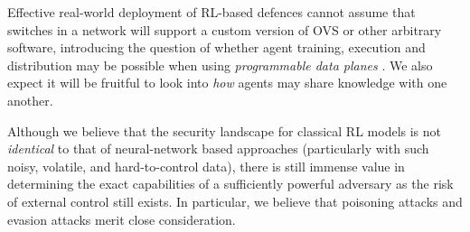 \documentclass[10pt, times, conference, letterpaper]{IEEEtran}
\begin{document}
Effective real-world deployment of RL-based defences cannot assume that switches in a network will support a custom version of OVS or other arbitrary software, introducing the question of whether agent training, execution and distribution may be possible when using \emph{programmable data planes} \cite{DBLP:conf/ancs/JouetP17}.
We also expect it will be fruitful to look into \emph{how} agents may share knowledge with one another.

Although we believe that the security landscape for classical RL models is not \emph{identical} to that of neural-network based approaches (particularly with such noisy, volatile, and hard-to-control data), there is still immense value in determining the exact capabilities of a sufficiently powerful adversary as the risk of external control still exists.
In particular, we believe that poisoning attacks and evasion attacks merit close consideration.
\end{document}
